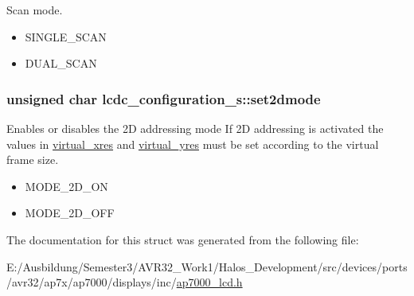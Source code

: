 Scan mode. 

\begin{itemize}
\item SINGLE\_\-SCAN \item DUAL\_\-SCAN \end{itemize}
\hypertarget{structlcdc__configuration__s_67cfa60b1c4a0f5ac452de527f7d3563}{
\subsubsection[{set2dmode}]{\setlength{\rightskip}{0pt plus 5cm}unsigned char {\bf lcdc\_\-configuration\_\-s::set2dmode}}}
\label{structlcdc__configuration__s_67cfa60b1c4a0f5ac452de527f7d3563}


Enables or disables the 2D addressing mode If 2D addressing is activated the values in \hyperlink{structlcdc__configuration__s_0b732746f63d5191f561b71be3f0d377}{virtual\_\-xres} and \hyperlink{structlcdc__configuration__s_26201aad2ad05301e6dd06ed5c174bbe}{virtual\_\-yres} must be set according to the virtual frame size. 

\begin{itemize}
\item MODE\_\-2D\_\-ON \item MODE\_\-2D\_\-OFF \end{itemize}


The documentation for this struct was generated from the following file:\begin{CompactItemize}
\item 
E:/Ausbildung/Semester3/AVR32\_\-Work1/Halos\_\-Development/src/devices/ports/avr32/ap7x/ap7000/displays/inc/\hyperlink{ap7000__lcd_8h}{ap7000\_\-lcd.h}\end{CompactItemize}
